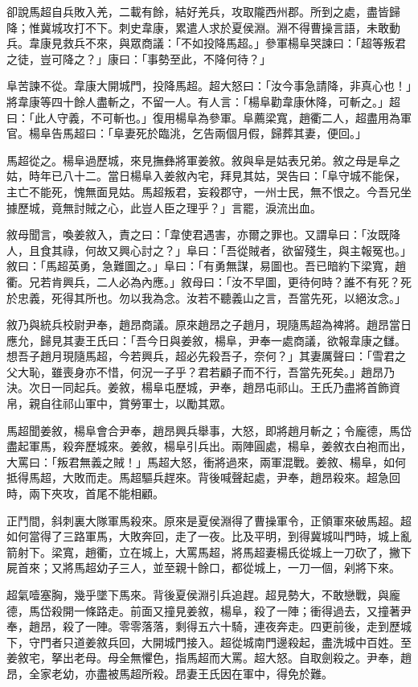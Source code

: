 卻說馬超自兵敗入羌，二載有餘，結好羌兵，攻取隴西州郡。所到之處，盡皆歸降；惟冀城攻打不下。刺史韋康，累遣人求於夏侯淵。淵不得曹操言語，未敢動兵。韋康見救兵不來，與眾商議：「不如投降馬超。」參軍楊阜哭諫曰：「超等叛君之徒，豈可降之？」康曰：「事勢至此，不降何待？」

阜苦諫不從。韋康大開城門，投降馬超。超大怒曰：「汝今事急請降，非真心也！」將韋康等四十餘人盡斬之，不留一人。有人言：「楊阜勸韋康休降，可斬之。」超曰：「此人守義，不可斬也。」復用楊阜為參軍。阜薦梁寬，趙衢二人，超盡用為軍官。楊阜告馬超曰：「阜妻死於臨洮，乞告兩個月假，歸葬其妻，便回。」

馬超從之。楊阜過歷城，來見撫彝將軍姜敘。敘與阜是姑表兄弟。敘之母是阜之姑，時年已八十二。當日楊阜入姜敘內宅，拜見其姑，哭告曰：「阜守城不能保，主亡不能死，愧無面見姑。馬超叛君，妄殺郡守，一州士民，無不恨之。今吾兄坐據歷城，竟無討賊之心，此豈人臣之理乎？」言罷，淚流出血。

敘母聞言，喚姜敘入，責之曰：「韋使君遇害，亦爾之罪也。又謂阜曰：「汝既降人，且食其祿，何故又興心討之？」阜曰：「吾從賊者，欲留殘生，與主報冤也。」敘曰：「馬超英勇，急難圖之。」阜曰：「有勇無謀，易圖也。吾已暗約下梁寬，趙衢。兄若肯興兵，二人必為內應。」敘母曰：「汝不早圖，更待何時？誰不有死？死於忠義，死得其所也。勿以我為念。汝若不聽義山之言，吾當先死，以絕汝念。」

敘乃與統兵校尉尹奉，趙昂商議。原來趙昂之子趙月，現隨馬超為裨將。趙昂當日應允，歸見其妻王氏曰：「吾今日與姜敘，楊阜，尹奉一處商議，欲報韋康之讎。想吾子趙月現隨馬超，今若興兵，超必先殺吾子，奈何？」其妻厲聲曰：「雪君之父大恥，雖喪身亦不惜，何況一子乎？君若顧子而不行，吾當先死矣。」趙昂乃決。次日一同起兵。姜敘，楊阜屯歷城，尹奉，趙昂屯祁山。王氏乃盡將首飾資帛，親自往祁山軍中，賞勞軍士，以勵其眾。

馬超聞姜敘，楊阜會合尹奉，趙昂興兵舉事，大怒，即將趙月斬之；令龐德，馬岱盡起軍馬，殺奔歷城來。姜敘，楊阜引兵出。兩陣圓處，楊阜，姜敘衣白袍而出，大罵曰：「叛君無義之賊！」馬超大怒，衝將過來，兩軍混戰。姜敘、楊阜，如何抵得馬超，大敗而走。馬超驅兵趕來。背後喊聲起處，尹奉，趙昂殺來。超急回時，兩下夾攻，首尾不能相顧。

正鬥間，斜刺裏大隊軍馬殺來。原來是夏侯淵得了曹操軍令，正領軍來破馬超。超如何當得了三路軍馬，大敗奔回，走了一夜。比及平明，到得冀城叫門時，城上亂箭射下。梁寬，趙衢，立在城上，大罵馬超，將馬超妻楊氏從城上一刀砍了，撇下屍首來；又將馬超幼子三人，並至親十餘口，都從城上，一刀一個，剁將下來。

超氣噎塞胸，幾乎墜下馬來。背後夏侯淵引兵追趕。超見勢大，不敢戀戰，與龐德，馬岱殺開一條路走。前面又撞見姜敘，楊阜，殺了一陣；衝得過去，又撞著尹奉，趙昂，殺了一陣。零零落落，剩得五六十騎，連夜奔走。四更前後，走到歷城下，守門者只道姜敘兵回，大開城門接入。超從城南門邊殺起，盡洗城中百姓。至姜敘宅，拏出老母。母全無懼色，指馬超而大罵。超大怒。自取劍殺之。尹奉，趙昂，全家老幼，亦盡被馬超所殺。昂妻王氏因在軍中，得免於難。

